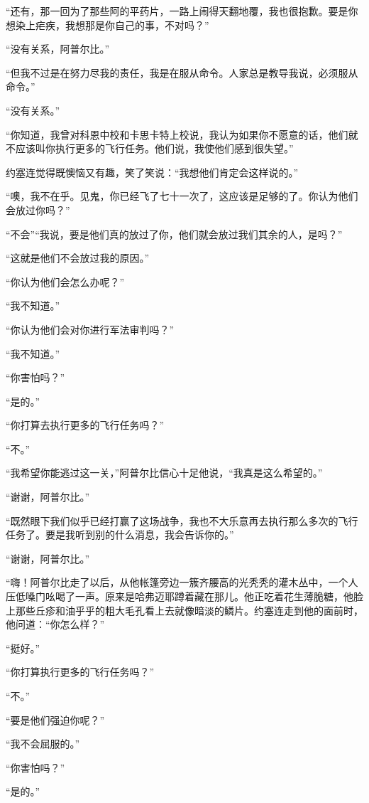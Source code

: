     “还有，那一回为了那些阿的平药片，一路上闹得天翻地覆，我也很抱歉。要是你想染上疟疾，我想那是你自己的事，不对吗？”

    “没有关系，阿普尔比。”

    “但我不过是在努力尽我的责任，我是在服从命令。人家总是教导我说，必须服从命令。”

    “没有关系。”

    “你知道，我曾对科恩中校和卡思卡特上校说，我认为如果你不愿意的话，他们就不应该叫你执行更多的飞行任务。他们说，我使他们感到很失望。”

    约塞连觉得既懊恼又有趣，笑了笑说：“我想他们肯定会这样说的。”

    “噢，我不在乎。见鬼，你已经飞了七十一次了，这应该是足够的了。你认为他们会放过你吗？”

    “不会”“我说，要是他们真的放过了你，他们就会放过我们其余的人，是吗？”

    “这就是他们不会放过我的原因。”

    “你认为他们会怎么办呢？”

    “我不知道。”

    “你认为他们会对你进行军法审判吗？”

    “我不知道。”

    “你害怕吗？”

    “是的。”

    “你打算去执行更多的飞行任务吗？”

    “不。”

    “我希望你能逃过这一关，”阿普尔比信心十足他说，“我真是这么希望的。”

    “谢谢，阿普尔比。”

    “既然眼下我们似乎已经打赢了这场战争，我也不大乐意再去执行那么多次的飞行任务了。要是我听到别的什么消息，我会告诉你的。”

    “谢谢，阿普尔比。”

    “嗨！阿普尔比走了以后，从他帐篷旁边一簇齐腰高的光秃秃的灌木丛中，一个人压低嗓门吆喝了一声。原来是哈弗迈耶蹲着藏在那儿。他正吃着花生薄脆糖，他脸上那些丘疹和油乎乎的粗大毛孔看上去就像暗淡的鳞片。约塞连走到他的面前时，他问道：“你怎么样？”

    “挺好。”

    “你打算执行更多的飞行任务吗？”

    “不。”

    “要是他们强迫你呢？”

    “我不会屈服的。”

    “你害怕吗？”

    “是的。”

